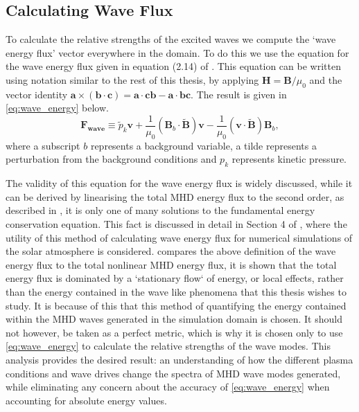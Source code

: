 \documentclass[a4paper,12pt,fourier,authoryear,custommargin]{Classes/PhDThesisPSnPDF}
\renewcommand{\vec}{\mathbf}
\begin{document}
\subsection{Calculating Wave Flux}\label{sec:waveflux}

To calculate the relative strengths of the excited waves we compute the `wave energy flux' vector everywhere in the domain.
To do this we use the equation for the wave energy flux given in equation (2.14) of \cite{leroy1985}.
This equation can be written using notation similar to the rest of this thesis, by applying $\vec{H} = \vec{B}/\mu_0$ and the vector identity $\vec{a} \times (\vec{b} \cdot \vec{c}) = \vec{a} \cdot \vec{c}\vec{b} - \vec{a} \cdot \vec{b}\vec{c}$.
The result is given in \cref{eq:wave_energy} below.
\begin{equation}
\vec{F}_{\textbf{wave}} \equiv \widetilde{p}_k \vec{v} + \frac{1}{\mu_0} \left(\vec{B}_b \cdot \vec{\widetilde{B}}\right) \vec{v} - \frac{1}{\mu_0}\left(\vec{v} \cdot \vec{\widetilde{B}} \right) \vec{B}_b,
\label{eq:wave_energy}
\end{equation}
where a subscript $b$ represents a background variable, a tilde represents a perturbation from the background conditions and $p_k$ represents kinetic pressure.

The validity of this equation for the wave energy flux is widely discussed, %
while it can be derived by linearising the total MHD energy flux to the second order, as described in \cite{leroy1985}, it is only one of many solutions to the fundamental energy conservation equation.
This fact is discussed in detail in Section 4 of \cite{bogdan2003}, where the utility of this method of calculating wave energy flux for numerical simulations of the solar atmosphere is considered.
\cite{bogdan2003} compares the above definition of the wave energy flux to the total nonlinear MHD energy flux, it is shown that the total energy flux is dominated by a `stationary flow` of energy, or local effects, rather than the energy contained in the wave like phenomena that this thesis wishes to study.
It is because of this that this method of quantifying the energy contained within the MHD waves generated in the simulation domain is chosen.
It should not however, be taken as a perfect metric, which is why it is chosen only to use \cref{eq:wave_energy} to calculate the relative strengths of the wave modes.
This analysis provides the desired result: an understanding of how the different plasma conditions and wave drives change the spectra of MHD wave modes generated, while eliminating any concern about the accuracy of \cref{eq:wave_energy} when accounting for absolute energy values.
\end{document}
